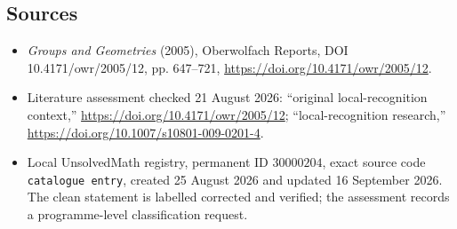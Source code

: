 \documentclass[11pt]{article}
\begin{document}
\subsection{Sources}
\begin{itemize}
\item \emph{Groups and Geometries} (2005), Oberwolfach Reports, DOI 10.4171/owr/2005/12, pp. 647--721, \url{https://doi.org/10.4171/owr/2005/12}.
\item Literature assessment checked 21 August 2026: ``original local-recognition context,'' \url{https://doi.org/10.4171/owr/2005/12}; ``local-recognition research,'' \url{https://doi.org/10.1007/s10801-009-0201-4}.
\item Local UnsolvedMath registry, permanent ID $30000204$, exact source code \texttt{catalogue entry}, created 25 August 2026 and updated 16 September 2026. The clean statement is labelled corrected and verified; the assessment records a programme-level classification request.
\end{itemize}
\end{document}
